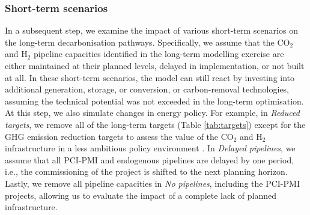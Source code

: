 \documentclass[pdflatex,sn-nature]{sn-jnl}%
\theoremstyle{thmstyleone}%
\theoremstyle{thmstyletwo}%
\theoremstyle{thmstylethree}%
\begin{document}
\subsubsection{Short-term scenarios}
\label{sec:short-term_scenarios}
In a subsequent step, we examine the impact of various short-term scenarios on the long-term decarbonisation pathways. Specifically, we assume that the CO$_2$ and H$_2$ pipeline capacities identified in the long-term modelling exercise are either maintained at their planned levels, delayed in implementation, or not built at all.
In these short-term scenarios, the model can still react by investing into additional generation, storage, or conversion, or carbon-removal technologies, assuming the technical potential was not exceeded in the long-term optimisation. At this step, we also simulate changes in energy policy. For example, in \textit{Reduced targets}, we remove all of the long-term targets (Table \ref{tab:targets}) except for the GHG emission reduction targets to assess the value of the CO$_2$ and H$_2$ infrastructure in a less ambitious policy environment \cite{europeancourtofauditorsEUsIndustrialPolicy2024}. In \textit{Delayed pipelines}, we assume that all PCI-PMI and endogenous pipelines are delayed by one period, i.e., the commissioning of the project is shifted to the next planning horizon. Lastly, we remove all pipeline capacities in \textit{No pipelines}, including the PCI-PMI projects, allowing us to evaluate the impact of a complete lack of planned infrastructure. 
\end{document}

